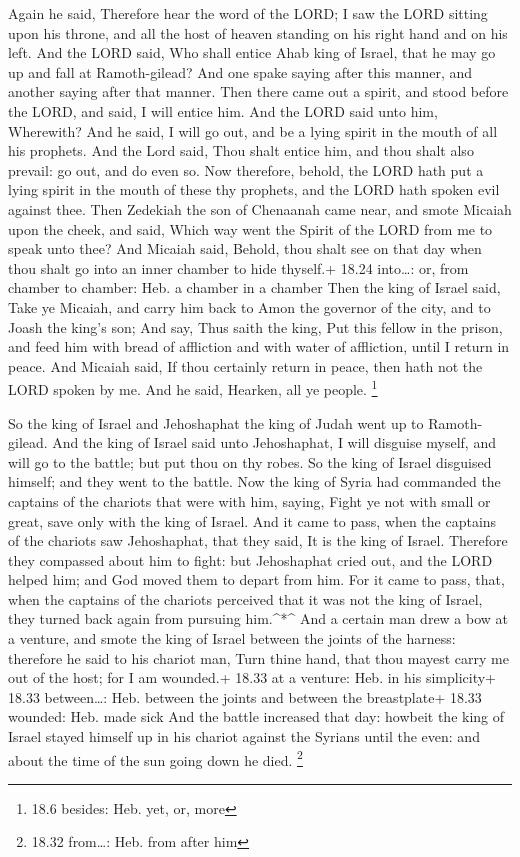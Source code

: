 Again he said, Therefore hear the word of the LORD; I saw
the LORD sitting upon his throne, and all the host of heaven standing on
his right hand and on his left.  And the LORD said, Who
shall entice Ahab king of Israel, that he may go up and fall at
Ramoth-gilead? And one spake saying after this manner, and another
saying after that manner.  Then there came out a spirit,
and stood before the LORD, and said, I will entice him. And the LORD
said unto him, Wherewith?  And he said, I will go out, and
be a lying spirit in the mouth of all his prophets. And the Lord said,
Thou shalt entice him, and thou shalt also prevail: go out, and do even
so.  Now therefore, behold, the LORD hath put a lying
spirit in the mouth of these thy prophets, and the LORD hath spoken evil
against thee.  Then Zedekiah the son of Chenaanah came
near, and smote Micaiah upon the cheek, and said, Which way went the
Spirit of the LORD from me to speak unto thee?  And Micaiah
said, Behold, thou shalt see on that day when thou shalt go into an
inner chamber to hide thyself.+ 18.24 into\ldots: or, from chamber to
chamber: Heb. a chamber in a chamber  Then the king of
Israel said, Take ye Micaiah, and carry him back to Amon the governor of
the city, and to Joash the king's son;  And say, Thus saith
the king, Put this fellow in the prison, and feed him with bread of
affliction and with water of affliction, until I return in peace.
 And Micaiah said, If thou certainly return in peace, then
hath not the LORD spoken by me. And he said, Hearken, all ye people.
\footnote{18.6 besides: Heb. yet, or, more}

 So the king of Israel and Jehoshaphat the king of Judah
went up to Ramoth-gilead.  And the king of Israel said unto
Jehoshaphat, I will disguise myself, and will go to the battle; but put
thou on thy robes. So the king of Israel disguised himself; and they
went to the battle.  Now the king of Syria had commanded
the captains of the chariots that were with him, saying, Fight ye not
with small or great, save only with the king of Israel. 
And it came to pass, when the captains of the chariots saw Jehoshaphat,
that they said, It is the king of Israel. Therefore they compassed about
him to fight: but Jehoshaphat cried out, and the LORD helped him; and
God moved them to depart from him.  For it came to pass,
that, when the captains of the chariots perceived that it was not the
king of Israel, they turned back again from pursuing him.\^{}*\^{}
 And a certain man drew a bow at a venture, and smote the
king of Israel between the joints of the harness: therefore he said to
his chariot man, Turn thine hand, that thou mayest carry me out of the
host; for I am wounded.+ 18.33 at a venture: Heb. in his simplicity+
18.33 between\ldots: Heb. between the joints and between the
breastplate+ 18.33 wounded: Heb. made sick  And the battle
increased that day: howbeit the king of Israel stayed himself up in his
chariot against the Syrians until the even: and about the time of the
sun going down he died. \footnote{18.32 from\ldots: Heb. from after him}

